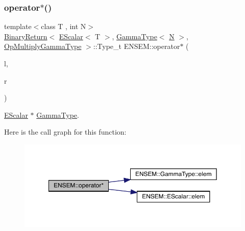 \subsubsection{\texorpdfstring{operator$\ast$()}{operator*()}\hspace{0.1cm}{\footnotesize\ttfamily [5/9]}}
{\footnotesize\ttfamily template$<$class T , int N$>$ \\
\mbox{\hyperlink{structENSEM_1_1BinaryReturn}{Binary\+Return}}$<$ \mbox{\hyperlink{classENSEM_1_1EScalar}{E\+Scalar}}$<$ T $>$, \mbox{\hyperlink{classENSEM_1_1GammaType}{Gamma\+Type}}$<$ \mbox{\hyperlink{adat__devel_2lib_2hadron_2operator__name__util_8cc_a7722c8ecbb62d99aee7ce68b1752f337}{N}} $>$, \mbox{\hyperlink{structENSEM_1_1OpMultiplyGammaType}{Op\+Multiply\+Gamma\+Type}} $>$\+::Type\+\_\+t E\+N\+S\+E\+M\+::operator$\ast$ (\begin{DoxyParamCaption}\item[{const \mbox{\hyperlink{classENSEM_1_1EScalar}{E\+Scalar}}$<$ T $>$ \&}]{l,  }\item[{const \mbox{\hyperlink{classENSEM_1_1GammaType}{Gamma\+Type}}$<$ \mbox{\hyperlink{adat__devel_2lib_2hadron_2operator__name__util_8cc_a7722c8ecbb62d99aee7ce68b1752f337}{N}} $>$ \&}]{r }\end{DoxyParamCaption})\hspace{0.3cm}{\ttfamily [inline]}}



\mbox{\hyperlink{classENSEM_1_1EScalar}{E\+Scalar}} $\ast$ \mbox{\hyperlink{classENSEM_1_1GammaType}{Gamma\+Type}}. 

Here is the call graph for this function\+:
\nopagebreak
\begin{figure}[H]
\begin{center}
\leavevmode
\includegraphics[width=350pt]{d4/dca/group__escalar_gacd3a5ba72921d671ee94910188b8c179_cgraph}
\end{center}
\end{figure}
\mbox{\label{group__escalar_ga37b9d878f5157952ec965d47a1032bc0}} 
